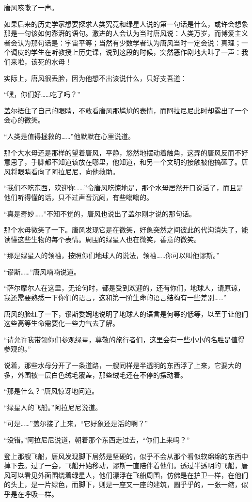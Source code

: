 唐风咳嗽了一声。

如果后来的历史学家想要探求人类究竟和绿星人说的第一句话是什么，或许会想象那是一句该如何澎湃的语句。激进的人会认为当时唐风说：人类万岁，而博爱主义者会认为那句话是：宇宙平等；当然有少数学者认为唐风当时一定会说：真理；一个调皮的学生在听教授上历史课，说到这段的时候，突然恶作剧地大叫了一声：我们来啦，该死的水母！

实际上，唐风很丢脸，因为他想不出该说什么，只好支吾道：

“嘿，你们好……吃了吗？”

盖尔捂住了自己的眼睛，不敢看唐风那尴尬的表情，而阿拉尼尼此时却露出了一个会心的微笑。

“人类是值得拯救的……”他默默在心里说道。

那个大水母还是那样的望着唐风，平静，悠然地摆动着触角，这弄的唐风反而不好意思了，手脚都不知道该放在哪里，他知道，和另一个文明的接触被他搞砸了。唐风将眼睛看向了阿拉尼尼，向他救助。

“我们不吃东西，欢迎你……”令唐风吃惊地是，那个水母居然开口说话了，而且是他们听得懂的话，只不过声音沉闷，有些嗡嗡的。

“真是奇妙……”不知不觉的，唐风也说出了盖尔刚才说的那句话。

那个水母微笑了一下。唐风发现它是在微笑，好象突然之间彼此的代沟消失了，能读懂这些生物的每个表情。周围的绿星人也在微笑，善意的微笑。

“那是绿星人的领袖，按照你们地球人的说法，领袖……你可以叫他谬斯。”

“谬斯……”唐风喃喃说道。

“萨尔摩尔人在这里，无论何时，都是受到欢迎的，还有你们，地球人，请原谅，我还需要熟悉一下你们的语言，这和第一阶生命的语言结构有一些差别……”

唐风的脸红了一下，谬斯委婉地说明了地球人的语言是何等的低等，以至于让他们这些高等生命需要化一些力气去了解。

“请允许我带领你们参观绿星，尊敬的旅行者们，这里会有一些小小的名胜是值得参观的。”

说着，那些水母分开了一条道路，一艘同样是半透明的东西浮了上来，它要大的多，外围被一层白色绒毛覆盖，那些绒毛还在不停的摆动着。

“那是什么？”唐风惊讶地问道。

“绿星人的飞船。”阿拉尼尼说道。

“可是……”盖尔接了上来，“它好象还是活的啊？”

“没错。”阿拉尼尼说道，朝着那个东西走过去，“你们上来吗？”

登上那艘飞船，唐风发现脚下居然是坚硬的，似乎不会从那个看似软绵绵的东西中掉下去。过了一会，飞船开始移动，谬斯一直陪伴着他们。透过半透明的飞船，唐风可以看见外面围绕着绿星人，他们漂浮在飞船周围，仿佛是在护卫一样，在他们的头上，是一片绿色，而脚下，则是一座又一座的建筑，圆乎乎的，一张一缩，似乎是在呼吸一样。


